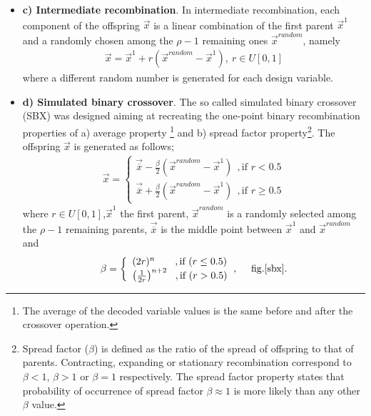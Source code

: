 \begin{itemize}
    
\item[]{\bf c) Intermediate recombination}.  In intermediate recombination, each component of the offspring $\vec{x}$ is a linear combination of the first parent $\vec{x}^1$ and a randomly chosen among the $\rho-1$ remaining ones $\vec{x}^{random}$, namely
\begin{eqnarray}
\nonumber
\vec{x}=\vec{x}^1+r(\vec{x}^{random}-\vec{x}^1),~ r\in U[0,1]
\end{eqnarray}  
where a different random number is generated for each design variable.
 
\item[]{\bf d) Simulated binary crossover}. The so called simulated binary crossover (SBX) \cite{SBX1} was designed aiming at recreating the one-point binary recombination properties of a) average property \footnote{The average of the decoded variable values is the same
before and after the crossover operation.} and b) spread factor property\footnote{Spread factor ($\beta$) is defined as the ratio of the spread of offspring to that of parents. Contracting, expanding or stationary recombination correspond to $\beta <1$, $\beta >1$ or $\beta =1$ respectively. The spread factor property states that probability of occurrence of spread factor $\beta \approx 1$ is more likely than any other $\beta$ value. }\cite{SBX1}. The offspring $\vec{x}$ is generated as follows;
\begin{eqnarray}
	\vec{x}={\left\{ 
	\begin{array}{ll}
    \vec{\overline{x}} - \frac{\beta}{2} (\vec{x}^{random}-\vec{x}^1)~~,\mbox{if $r < 0.5$}\\
	\vec{\overline{x}} + \frac{\beta}{2} (\vec{x}^{random}-\vec{x}^1)~~,\mbox{if $r \geq 0.5$}
    \end{array} \right. }
    \label{sbxx}
\end{eqnarray}  
where $r\in U[0,1]$,$\vec{x}^1$ the first parent, $\vec{x}^{random}$ is a randomly selected among the $\rho-1$ remaining parents, $\vec{\overline{x}}$ is the middle point between $\vec{x}^{1}$ and $\vec{x}^{random}$ and 
\begin{eqnarray}
	\beta={\left\{ 
	\begin{array}{ll}
    (2r)^{n}~~~~~~,\mbox{if $(r \leq 0.5)$}\\
	\left(\frac{1}{2r}\right)^{n+2}~~,\mbox{if $(r > 0.5)$}
    \end{array} \right. },~~~~ \mbox{fig.\ref{sbx}}.
    \label{betasbx}
\end{eqnarray}


\end{itemize}
